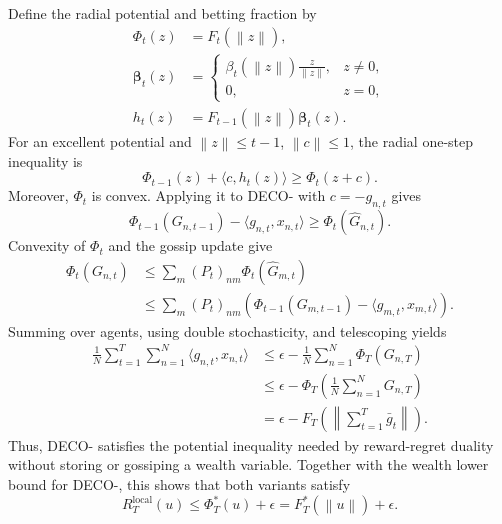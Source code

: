 \documentclass[12pt,english]{reviewresponse}
\newcommand{\norm}[1]{\left\lVert#1\right\rVert}
\newcommand{\algname}{{DECO}\xspace}
\begin{document}
\begin{revresponse}
\begin{changes}
        Define the radial potential and betting fraction by
        \begin{align*}
            \Phi_t(z)               & =F_t(\norm{z}),                            \\
            \boldsymbol{\beta}_t(z) & =
            \begin{cases}
                \displaystyle\beta_t(\norm{z})\frac{z}{\norm{z}}, & z\neq0, \\
                0,                                                & z=0,
            \end{cases}      \\
            h_t(z)                  & =F_{t-1}(\norm{z})\boldsymbol{\beta}_t(z).
        \end{align*}
        For an excellent potential and $\norm{z}\leq t-1$, $\norm{c}\leq1$, the radial one-step inequality is
        \begin{equation*}
            \Phi_{t-1}(z)+\langle c,h_t(z)\rangle\geq\Phi_t(z+c).
        \end{equation*}
        Moreover, $\Phi_t$ is convex.
        Applying it to \algname{}- with $c=-g_{n,t}$ gives
        \begin{equation*}
            \Phi_{t-1}(G_{n,t-1})-\langle g_{n,t},x_{n,t}\rangle
            \geq\Phi_t(\widehat G_{n,t}).
        \end{equation*}
        Convexity of $\Phi_t$ and the gossip update give
        \begin{align*}
            \Phi_t(G_{n,t})
             & \leq\sum_m{(P_t)}_{nm}\Phi_t(\widehat G_{m,t}) \\
             & \leq\sum_m{(P_t)}_{nm}\left(
            \Phi_{t-1}(G_{m,t-1})-\langle g_{m,t},x_{m,t}\rangle
            \right).
        \end{align*}
        Summing over agents, using double stochasticity, and telescoping yields
        \begin{align*}
            \frac{1}{N}\sum_{t=1}^T\sum_{n=1}^{N}\langle g_{n,t},x_{n,t}\rangle
             & \leq\epsilon-\frac{1}{N}\sum_{n=1}^{N}\Phi_T(G_{n,T})            \\
             & \leq\epsilon-\Phi_T\left(\frac{1}{N}\sum_{n=1}^{N}G_{n,T}\right) \\
             & =\epsilon-F_T\left(\norm{\sum_{t=1}^T\bar g_t}\right).
        \end{align*}
        Thus, \algname{}- satisfies the potential inequality needed by reward-regret duality without storing or gossiping a wealth variable.
        Together with the wealth lower bound for \algname{}-, this shows that both variants satisfy
        \begin{equation*}
            R_T^{\mathrm{local}}(u)
            \leq\Phi_T^*(u)+\epsilon
            =F_T^*(\norm{u})+\epsilon.
        \end{equation*}
    \end{changes}
\end{revresponse}
\end{document}
